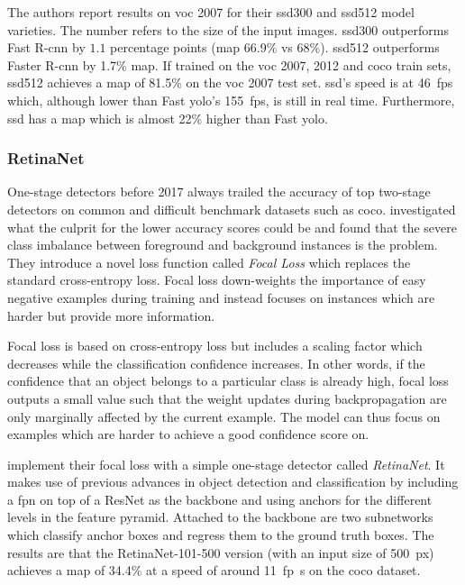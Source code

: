 \documentclass[final]{vutinfth} %
\begin{document}
The authors report results on \gls{voc} 2007 for their \gls{ssd}300
and \gls{ssd}512 model varieties. The number refers to the size of the
input images. \gls{ssd}300 outperforms Fast R-\gls{cnn} by $1.1$
percentage points (\gls{map} 66.9\% vs 68\%). \gls{ssd}512 outperforms
Faster R-\gls{cnn} by 1.7\% \gls{map}. If trained on the \gls{voc}
2007, 2012 and \gls{coco} train sets, \gls{ssd}512 achieves a
\gls{map} of 81.5\% on the \gls{voc} 2007 test set. \gls{ssd}'s speed
is at \qty{46}{fps} which, although lower than Fast \gls{yolo}'s
\qty{155}{fps}, is still in real time. Furthermore, \gls{ssd} has a
\gls{map} which is almost 22\% higher than Fast \gls{yolo}.

\subsubsection{RetinaNet}
\label{sssec:theory-retinanet}

One-stage detectors before 2017 always trailed the accuracy of top
two-stage detectors on common and difficult benchmark datasets such
as \gls{coco}. \textcite{lin2017b} investigated what the culprit for
the lower accuracy scores could be and found that the severe class
imbalance between foreground and background instances is the
problem. They introduce a novel loss function called \emph{Focal Loss}
which replaces the standard cross-entropy loss. Focal loss
down-weights the importance of easy negative examples during training
and instead focuses on instances which are harder but provide more
information.

Focal loss is based on cross-entropy loss but includes a scaling
factor which decreases while the classification confidence
increases. In other words, if the confidence that an object belongs to
a particular class is already high, focal loss outputs a small value
such that the weight updates during backpropagation are only
marginally affected by the current example. The model can thus focus
on examples which are harder to achieve a good confidence score on.

\textcite{lin2017b} implement their focal loss with a simple one-stage
detector called \emph{RetinaNet}. It makes use of previous advances in
object detection and classification by including a \gls{fpn} on top of
a ResNet \cite{he2016} as the backbone and using anchors for the
different levels in the feature pyramid. Attached to the backbone are
two subnetworks which classify anchor boxes and regress them to the
ground truth boxes. The results are that the RetinaNet-101-500 version
(with an input size of \qty{500}{px}) achieves a \gls{map} of 34.4\%
at a speed of around \qty{11}{fp\s} on the \gls{coco} dataset.
\end{document}
